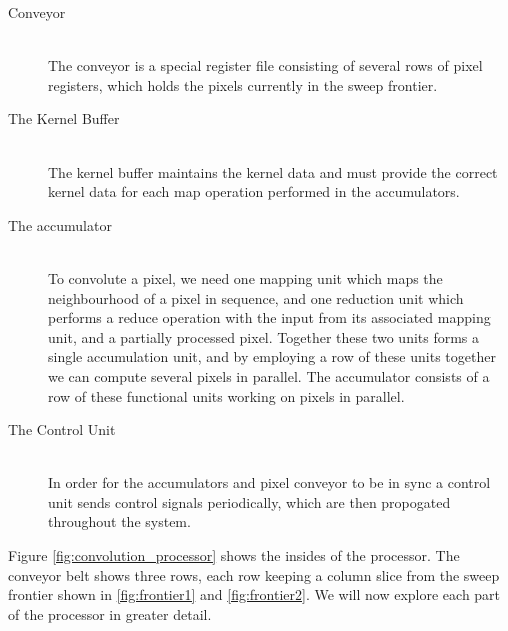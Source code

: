 \begin{description}
    \item[Conveyor] \hfill\\ 
        The conveyor is a special register file consisting of several rows of pixel registers, which holds the pixels currently in the sweep frontier.
    \item[The Kernel Buffer] \hfill\\
        The kernel buffer maintains the kernel data and must provide the correct kernel data for each map operation performed in the accumulators.
    \item[The accumulator] \hfill\\
        To convolute a pixel, we need one mapping unit which maps the neighbourhood of a pixel in sequence, and one reduction unit which performs a reduce operation with the input from its associated mapping unit, and a partially processed pixel.
        Together these two units forms a single accumulation unit, and by employing a row of these units together we can compute several pixels in parallel.
        The accumulator consists of a row of these functional units working on pixels in parallel.
    \item[The Control Unit] \hfill\\
        In order for the accumulators and pixel conveyor to be in sync a control unit sends control signals periodically, which are then propogated throughout the system.
\end{description}

Figure \ref{fig:convolution_processor} shows the insides of the processor. 
The conveyor belt shows three rows, each row keeping a column slice from the sweep frontier shown in \ref{fig:frontier1} and \ref{fig:frontier2}.
We will now explore each part of the processor in greater detail.

